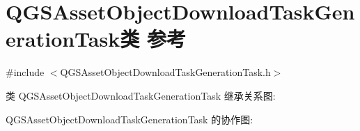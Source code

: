 \hypertarget{class_q_g_s_asset_object_download_task_generation_task}{}\section{Q\+G\+S\+Asset\+Object\+Download\+Task\+Generation\+Task类 参考}
\label{class_q_g_s_asset_object_download_task_generation_task}


{\ttfamily \#include $<$Q\+G\+S\+Asset\+Object\+Download\+Task\+Generation\+Task.\+h$>$}



类 Q\+G\+S\+Asset\+Object\+Download\+Task\+Generation\+Task 继承关系图\+:


Q\+G\+S\+Asset\+Object\+Download\+Task\+Generation\+Task 的协作图\+:
